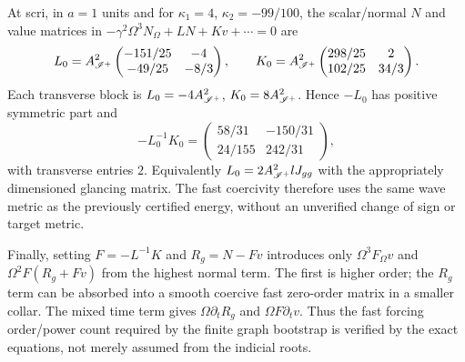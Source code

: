 At scri, in $a=1$ units and for $\kappa_1=4$, $\kappa_2=-99/100$, the
scalar/normal $N$ and value matrices in
$-\gamma^2\Omega^3N_\Omega+LN+Kv+\cdots=0$ are
\[
 L_0=A_{\mathscr I^+}^2
 \begin{pmatrix}-151/25&-4\\-49/25&-8/3\end{pmatrix},\qquad
 K_0=A_{\mathscr I^+}^2
 \begin{pmatrix}298/25&2\\102/25&34/3\end{pmatrix}.
\]
Each transverse block is $L_0=-4A_{\mathscr I^+}^2$,
$K_0=8A_{\mathscr I^+}^2$. Hence $-L_0$ has positive symmetric part and
\[
 -L_0^{-1}K_0=
 \begin{pmatrix}58/31&-150/31\\24/155&242/31\end{pmatrix},
\]
with transverse entries $2$. Equivalently $L_0=2A_{\mathscr I^+}^2lJ_{gg}$ with
the appropriately dimensioned glancing matrix. The fast coercivity therefore
uses the same wave metric as the previously certified energy, without an
unverified change of sign or target metric.

Finally, setting $F=-L^{-1}K$ and $R_g=N-Fv$ introduces only
$\Omega^3F_\Omega v$ and $\Omega^2F(R_g+Fv)$ from the highest normal term.
The first is higher order; the $R_g$ term can be absorbed into a smooth
coercive fast zero-order matrix in a smaller collar. The mixed time term
gives $\Omega\partial_tR_g$ and $\Omega F\partial_tv$. Thus the fast forcing
order/power count required by the finite graph bootstrap is verified by the
exact equations, not merely assumed from the indicial roots.

